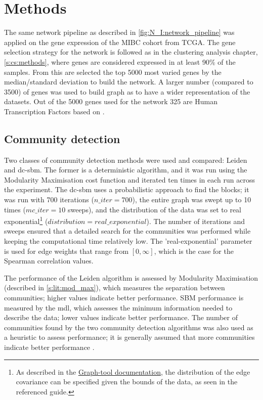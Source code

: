 \section{Methods}


The same network pipeline as described in \cref{fig:N_I:network_pipeline} was applied on the gene expression of the MIBC cohort from TCGA. The gene selection strategy for the network is followed as in the clustering analysis chapter, \cref{s:cs:methods}, where genes are considered expressed in at least 90\% of the samples. From this are selected the top 5000 most varied genes by the median/standard deviation to build the network. A larger number (compared to 3500) of genes was used to build graph as to have a wider representation of the datasets. Out of the 5000 genes used for the network 325 are Human Transcription Factors based on \citet{Lambert2018-el}.
 
\subsection*{Community detection} \label{s:N_I:sel_tfs_methods_comm_detection}

Two classes of community detection methods were used and compared: Leiden and \acrfull{dc-sbm}. The former is a deterministic algorithm, and it was run using the Modularity Maximisation cost function and iterated ten times in each run across the experiment. The \acrshort{dc-sbm} uses a probabilistic approach to find the blocks; it was run with 700 iterations ($n\_iter=700$), the entire graph was swept up to 10 times ($mc\_iter=10$ sweeps), and the distribution of the data was set to real exponential\footnote{As described in the \href{https://graph-tool.skewed.de/static/doc/demos/inference/inference.html}{Graph-tool documentation}, the distribution of the edge covariance can be specified given the bounds of the data, as seen in the referenced guide.} ($distribution=real\_exponential$). The number of iterations and sweeps ensured that a detailed search for the communities was performed while keeping the computational time relatively low. The 'real-exponential' parameter is used for edge weights that range from $[0, \infty]$, which is the case for the Spearman correlation values.

The performance of the Leiden algorithm is assessed by Modularity Maximisation (described in \cref{s:lit:mod_max}), which measures the separation between communities; higher values indicate better performance. SBM performance is measured by the \acrfull{mdl}, which assesses the minimum information needed to describe the data; lower values indicate better performance. The number of communities found by the two community detection algorithms was also used as a heuristic to assess performance; it is generally assumed that more communities indicate better performance \citep{Care2019-ij}.


